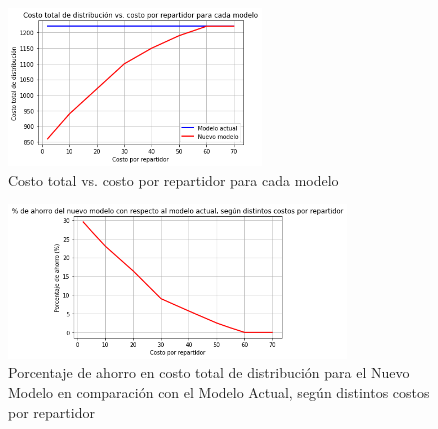 \documentclass{article}
\begin{document}
    \begin{table}[H]
    \centering
    \caption{Comparación de costos entre metodologías para distintos costos por repartidor}
    \end{table}


    \begin{figure}[H]
        \centering
        \includegraphics[width=0.6\textwidth]{costo_tot_vs_costo_rep.png}
        \caption{Costo total vs. costo por repartidor para cada modelo}
        \label{fig:mi-imagen}
    \end{figure}


    \begin{figure}[H]
        \centering
        \includegraphics[width=0.8\textwidth]{porcentaje_ahorro_vs_costo_rep.png}
        \caption{Porcentaje de ahorro en costo total de distribución para el Nuevo Modelo en comparación con el Modelo Actual, según distintos costos por repartidor}
        \label{fig:mi-imagen}
    \end{figure}
\end{document}
